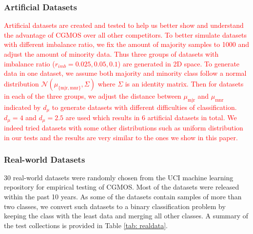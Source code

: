 \documentclass[10pt,journal,compsoc]{IEEEtran}
\begin{document}
\subsubsection{Artificial Datasets}
\textcolor{red}{Artificial datasets are created and tested to help us better show and understand the advantage of CGMOS over all other competitors. To better simulate datasets with different imbalance ratio, we fix the amount of majority samples to 1000 and adjust the amount of minority data. Thus three groups of datasets with imbalance ratio ($r_{imb}=0.025, 0.05, 0.1$) are generated in 2D space. To generate data in one dataset, we assume both majority and minority class follow a normal distribution $\mathcal{N}(\mu_{\{\mbox{mjr}, \mbox{mnr}\}}, \Sigma)$ where $\Sigma$ is an identity matrix. Then for datasets in each of the three groups, we adjust the distance between $\mu_{\mbox{mjr}}$ and $\mu_{\mbox{mnr}}$ indicated by $d_{\mu}$ to generate datasets with different difficulties of classification. $d_{\mu}=4$ and $d_{\mu}=2.5$ are used which results in 6 artificial datasets in total. We indeed tried datasets with some other distributions such as uniform distribution in our tests and the results are very similar to the ones we show in this paper.}

\subsubsection{Real-world Datasets}
30 real-world datasets were randomly chosen from the UCI machine learning repository \cite{Lichman:2013} for empirical testing of CGMOS. Most of the datasets were released within the past 10 years. As some of the datasets contain samples of more than two classes, we convert such datasets to a binary classification problem by keeping the class with the least data and merging all other classes. A summary of the test collections is provided in Table \ref{tab: realdata}.
\end{document}
